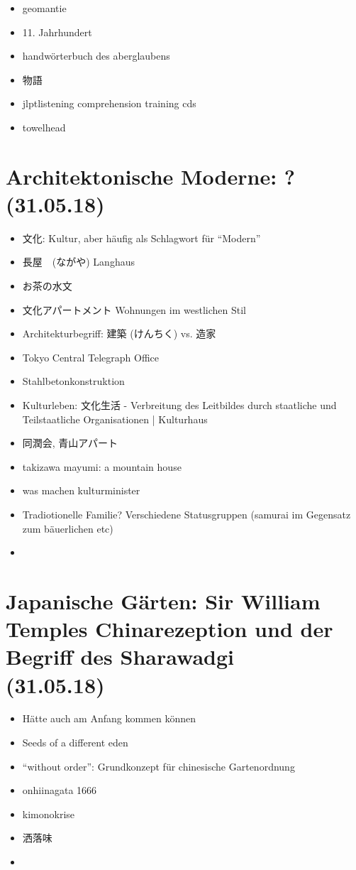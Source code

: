 \documentclass[emulatestandardclasses]{scrartcl}
\begin{document}
\begin{itemize}
  \item geomantie
  \item 11. Jahrhundert
  \item handwörterbuch des aberglaubens
  \item 物語
  \item jlptlistening comprehension training cds
  \item towelhead
\end{itemize}



\section{Architektonische Moderne: ?\\(31.05.18)}

\begin{itemize}
  \item 文化: Kultur, aber häufig als Schlagwort für "`Modern"'
  \item 長屋　(ながや) Langhaus
  \item お茶の水文
  \item 文化アパートメント Wohnungen im westlichen Stil 
  \item Architekturbegriff: 建築 (けんちく) vs. 造家
  \item Tokyo Central Telegraph Office
  \item Stahlbetonkonstruktion
  \item Kulturleben: 文化生活 - Verbreitung des Leitbildes durch staatliche und Teilstaatliche Organisationen | Kulturhaus
  \item 同潤会, 青山アパート
  \item takizawa mayumi: a mountain house
  \item was machen kulturminister
  \item Tradiotionelle Familie? Verschiedene Statusgruppen (samurai im Gegensatz zum bäuerlichen etc)
  \item 
\end{itemize}

\section{Japanische Gärten: Sir William Temples Chinarezeption und der Begriff des Sharawadgi
\\(31.05.18)}

\begin{itemize}
  \item Hätte auch am Anfang kommen können
  \item Seeds of a different eden
  \item "`without order"': Grundkonzept für chinesische Gartenordnung
  \item onhiinagata 1666
  \item kimonokrise
  \item 洒落味
  \item 
\end{itemize}
\end{document}
